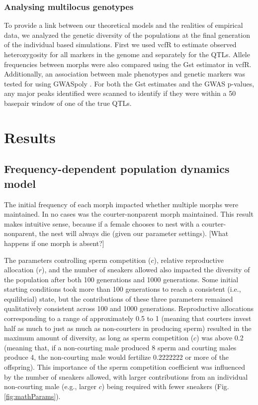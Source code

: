 \documentclass[
  11pt,
]{article}
\begin{document}
\hypertarget{analysing-multilocus-genotypes}{%
\subsubsection{Analysing multilocus genotypes}\label{analysing-multilocus-genotypes}}

To provide a link between our theoretical models and the realities of
empirical data, we analyzed the genetic diversity of the populations at
the final generation of the individual based simulations. First we used
vcfR to estimate observed heterozygosity for all markers in the genome
and separately for the QTLs. Allele frequencies between morphs were also
compared using the Gst estimator in vcfR.
Additionally, an association between male phenotypes and genetic markers
was tested for using GWASpoly . For both the Gst estimates and the GWAS
p-values, any major peaks identified were scanned to identify if they
were within a 50 basepair window of one of the true QTLs.

\hypertarget{results}{%
\section{Results}\label{results}}

\hypertarget{frequency-dependent-population-dynamics-model-1}{%
\subsection{Frequency-dependent population dynamics model}\label{frequency-dependent-population-dynamics-model-1}}

The initial frequency of each morph impacted whether multiple morphs
were maintained. In no cases was the courter-nonparent morph maintained.
This result makes intuitive sense, because if a female chooses to nest
with a courter-nonparent, the nest will always die (given our parameter
settings). {[}What happens if one morph is absent?{]}

The parameters controlling sperm competition (\(c\)), relative
reproductive allocation (\(r\)), and the number of sneakers allowed also
impacted the diversity of the population after both 100 generations and
1000 generations. Some initial starting conditions took more than 100
generations to reach a consistent (i.e., equilibrial) state, but the
contributions of these three parameters remained qualitatively
consistent across 100 and 1000 generations. Reproductive allocations
corresponding to a range of approximately 0.5 to 1 (meaning that
courters invest half as much to just as much as non-courters in
producing sperm) resulted in the maximum amount of diversity, as long as
sperm competition (\(c\)) was above 0.2 (meaning that, if a non-courting
male produced 8 sperm and courting males produce 4, the non-courting
male would fertilize 0.2222222 or more of the
offspring). This importance of the sperm competition coefficient was
influenced by the number of sneakers allowed, with larger contributions
from an individual non-courting male (e.g., larger \(c\)) being required
with fewer sneakers (Fig. \ref{fig:mathParams}).
\end{document}
